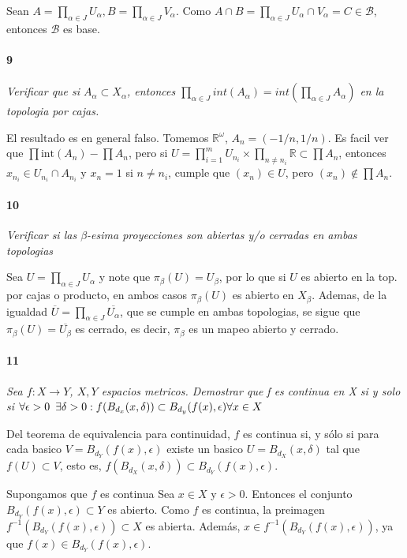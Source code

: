 \documentclass[12pt]{article}
\begin{document}
Sean $A=\prod_{\alpha \in J}U_\alpha, B=\prod_{\alpha \in J} V_\alpha$. Como $A \cap B=\prod_{\alpha \in J} U_\alpha \cap V_\alpha = C \in \mathcal{B}$, entonces $\mathcal{B}$ es base.

\paragraph{9}
\textit{Verificar que si $A_{\alpha}\subset X_{\alpha}$, entonces $\prod\limits_{\alpha\in J } int(A_{\alpha}) = int(\prod\limits_{\alpha\in J }A_{\alpha})$ en la topologia por cajas.}

El resultado es en general falso. Tomemos $\mathbb{R}^\omega$, $A_n=\left(-1/n,1/n\right)$. Es facil ver que $\prod \text{int}(A_n)-\prod A_n$, pero si $U=\prod_{i=1}^{m} U_{n_i} \times \prod_{n\neq n_i} \mathbb{R} \subset \prod A_n$,
entonces $x_{n_i} \in U_{n_i} \cap A_{n_i}$ y $x_n=1$ si $n \neq n_i$, cumple que $(x_n) \in U$, pero $(x_n) \notin \prod A_n$.
\paragraph{10}
\textit{Verificar si las $\beta$-esima proyecciones son abiertas y/o cerradas en ambas topologias}

Sea $U=\prod_{\alpha \in J} U_\alpha$ y note que $\pi_\beta(U)=U_\beta$, por lo que si $U$ es abierto en la top. por cajas o producto, en ambos casos $\pi_\beta(U)$ es abierto en $X_\beta$.
Ademas, de la igualdad $\overline{U}=\prod_{\alpha \in J} \overline{U_\alpha}$, que se cumple en ambas topologias, se sigue que $\pi_\beta(U)=\overline{U_\beta}$ es cerrado, es decir, $\pi_\beta$ es un mapeo abierto y cerrado.
\paragraph{11}
\textit{Sea $f:X \to Y$, $X,Y$ espacios metricos. Demostrar que f es continua en X si y solo si $\forall\epsilon>0\hspace{5px}\exists\delta>0 : f(B_{d_x}(x,\delta))\subset B_{d_y}(f(x),\epsilon) \forall x\in X$}

Del teorema de equivalencia para continuidad, $f$ es continua si, y sólo si para cada basico $V=B_{d_Y}(f(x),\epsilon)$ existe un basico $U=B_{d_X}(x,\delta)$ tal que $f(U) \subset V$, esto es, $f(B_{d_X}(x,\delta)) \subset B_{d_Y}(f(x),\epsilon)$.

\vspace{1em}
Supongamos que \( f \) es continua
Sea \( x \in X \) y \( \epsilon > 0 \). Entonces el conjunto \( B_{d_Y}(f(x), \epsilon) \subset Y \) es abierto.  
Como \( f \) es continua, la preimagen \( f^{-1}(B_{d_Y}(f(x), \epsilon)) \subset X \) es abierta.  
Además, \( x \in f^{-1}(B_{d_Y}(f(x), \epsilon)) \), ya que \( f(x) \in B_{d_Y}(f(x), \epsilon) \).
\end{document}
